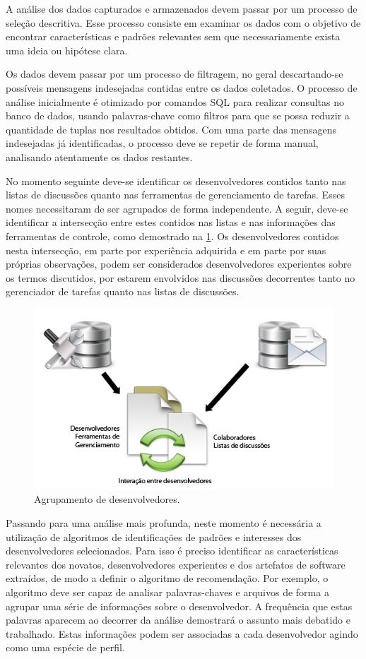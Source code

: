 \documentclass[oneside,brazil,a4paper]{normas-utf-tex}
\begin{document}
A análise dos dados capturados e armazenados devem passar por um processo de seleção descritiva. Esse processo consiste em examinar os dados com o objetivo de encontrar características e padrões relevantes sem que necessariamente exista uma ideia ou hipótese clara.

Os dados devem passar por um processo de filtragem, no geral descartando-se possíveis mensagens indesejadas contidas entre os dados coletados. O processo de análise inicialmente é otimizado por comandos SQL para realizar consultas no banco de dados, usando palavras-chave como filtros para que se possa reduzir a quantidade de tuplas nos resultados obtidos. Com uma parte das mensagens indesejadas já identificadas, o processo deve se repetir de forma manual, analisando atentamente os dados restantes. 

No momento seguinte deve-se identificar os desenvolvedores contidos tanto nas listas de discussões quanto nas ferramentas de gerenciamento de tarefas. Esses nomes necessitaram de ser agrupados de forma independente. A seguir, deve-se identificar a intersecção entre estes contidos nas listas e nas informações das ferramentas de controle, como demostrado na \cref{fig:int}. Os desenvolvedores contidos nesta intersecção, em parte por experiência adquirida e em parte por suas próprias observações, podem ser considerados  desenvolvedores experientes sobre os termos discutidos, por estarem envolvidos nas discussões decorrentes tanto no gerenciador de tarefas quanto nas listas de discussões.

\begin{figure}[!htb]
    \centering
    \includegraphics[width= .8\textwidth]{figuras/interacao}
    \caption{Agrupamento de desenvolvedores.}
    \label{fig:int}
\end{figure}

Passando para uma análise mais profunda, neste momento é necessária a utilização de algoritmos de identificações de padrões e interesses dos desenvolvedores selecionados. Para isso é preciso identificar as características relevantes dos novatos, desenvolvedores experientes e dos artefatos de software extraídos, de modo a definir o algoritmo de recomendação. Por exemplo, o algoritmo deve ser capaz de analisar palavras-chaves e arquivos de forma a agrupar uma série de informações sobre o desenvolvedor.  A frequência que estas palavras aparecem ao decorrer da análise demostrará o assunto mais debatido e trabalhado. Estas informações podem ser associadas a cada desenvolvedor agindo como uma espécie de perfil. 
\end{document}
